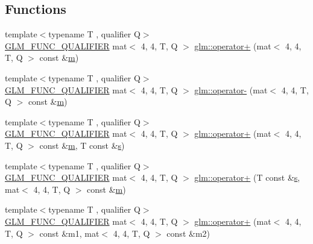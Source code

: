 \subsection*{Functions}
\begin{DoxyCompactItemize}
\item 
{\footnotesize template$<$typename T , qualifier Q$>$ }\\\hyperlink{setup_8hpp_a33fdea6f91c5f834105f7415e2a64407}{G\+L\+M\+\_\+\+F\+U\+N\+C\+\_\+\+Q\+U\+A\+L\+I\+F\+I\+ER} mat$<$ 4, 4, T, Q $>$ \hyperlink{namespaceglm_a03db222d057436a66bdb95bba575ba6b}{glm\+::operator+} (mat$<$ 4, 4, T, Q $>$ const \&\hyperlink{_s_d_l__opengl__glext_8h_af593500c283bf1a787a6f947f503a5c2}{m})
\item 
{\footnotesize template$<$typename T , qualifier Q$>$ }\\\hyperlink{setup_8hpp_a33fdea6f91c5f834105f7415e2a64407}{G\+L\+M\+\_\+\+F\+U\+N\+C\+\_\+\+Q\+U\+A\+L\+I\+F\+I\+ER} mat$<$ 4, 4, T, Q $>$ \hyperlink{namespaceglm_a5bffee6489f103cf823c19f8e5b09e24}{glm\+::operator-\/} (mat$<$ 4, 4, T, Q $>$ const \&\hyperlink{_s_d_l__opengl__glext_8h_af593500c283bf1a787a6f947f503a5c2}{m})
\item 
{\footnotesize template$<$typename T , qualifier Q$>$ }\\\hyperlink{setup_8hpp_a33fdea6f91c5f834105f7415e2a64407}{G\+L\+M\+\_\+\+F\+U\+N\+C\+\_\+\+Q\+U\+A\+L\+I\+F\+I\+ER} mat$<$ 4, 4, T, Q $>$ \hyperlink{namespaceglm_ae26a037c7de3f3c22ded5612bc42efa2}{glm\+::operator+} (mat$<$ 4, 4, T, Q $>$ const \&\hyperlink{_s_d_l__opengl__glext_8h_af593500c283bf1a787a6f947f503a5c2}{m}, T const \&\hyperlink{_s_d_l__opengl_8h_a4af680a6c683f88ed67b76f207f2e6e4}{s})
\item 
{\footnotesize template$<$typename T , qualifier Q$>$ }\\\hyperlink{setup_8hpp_a33fdea6f91c5f834105f7415e2a64407}{G\+L\+M\+\_\+\+F\+U\+N\+C\+\_\+\+Q\+U\+A\+L\+I\+F\+I\+ER} mat$<$ 4, 4, T, Q $>$ \hyperlink{namespaceglm_aae71418fa4d956737bea9695abd62b7d}{glm\+::operator+} (T const \&\hyperlink{_s_d_l__opengl_8h_a4af680a6c683f88ed67b76f207f2e6e4}{s}, mat$<$ 4, 4, T, Q $>$ const \&\hyperlink{_s_d_l__opengl__glext_8h_af593500c283bf1a787a6f947f503a5c2}{m})
\item 
{\footnotesize template$<$typename T , qualifier Q$>$ }\\\hyperlink{setup_8hpp_a33fdea6f91c5f834105f7415e2a64407}{G\+L\+M\+\_\+\+F\+U\+N\+C\+\_\+\+Q\+U\+A\+L\+I\+F\+I\+ER} mat$<$ 4, 4, T, Q $>$ \hyperlink{namespaceglm_a7d22ecd127bca5161a879a9b60edc9d0}{glm\+::operator+} (mat$<$ 4, 4, T, Q $>$ const \&m1, mat$<$ 4, 4, T, Q $>$ const \&m2)

\end{DoxyCompactItemize}
